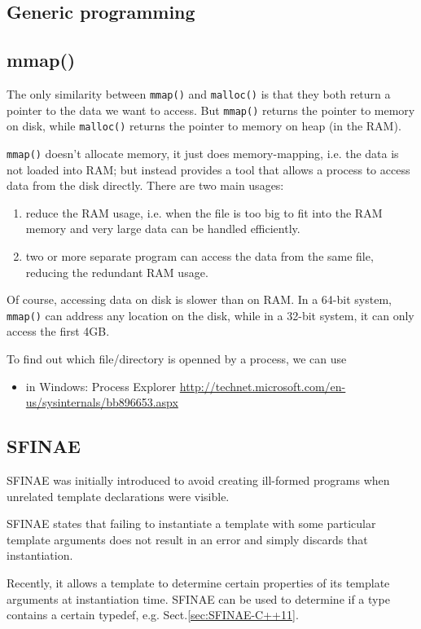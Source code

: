 \subsection{Generic programming}


\subsection{mmap()}
\label{sec:mmap}


The only similarity between \verb!mmap()! and \verb!malloc()! is that they both
return a pointer to the data we want to access. But \verb!mmap()! returns the
pointer to memory on disk, while \verb!malloc()! returns the pointer to memory
on heap (in the RAM). 

\verb!mmap()! doesn't allocate memory, it just does memory-mapping, i.e. the
data is not loaded into RAM; but instead provides a tool that allows a process
to access data from the disk directly. There are two main usages:
\begin{enumerate}
  \item reduce the RAM usage, i.e. when the file is too big to fit into the RAM
  memory and very large data can be handled efficiently.
  \item two or more separate program can access the data from the same file,
  reducing the redundant RAM usage.
\end{enumerate}
Of course, accessing data on disk is slower than on RAM. In a 64-bit system,
\verb!mmap()! can address any location on the disk, while in a 32-bit system, it
can only access the first 4GB.


To find out which file/directory is openned by a process, we can use
\begin{itemize}
  \item in Windows: Process Explorer
  \url{http://technet.microsoft.com/en-us/sysinternals/bb896653.aspx}
\end{itemize}

\subsection{SFINAE}
\label{sec:SFINAE}

SFINAE was initially introduced to avoid creating ill-formed programs when unrelated template declarations were visible.

SFINAE states that failing to instantiate a template with some particular
template arguments does not result in an error and simply discards that
instantiation. 

Recently, it allows a template to determine certain properties of its template arguments at instantiation time.
SFINAE can be used to determine if a type contains a certain typedef, e.g. Sect.\ref{sec:SFINAE-C++11}.

